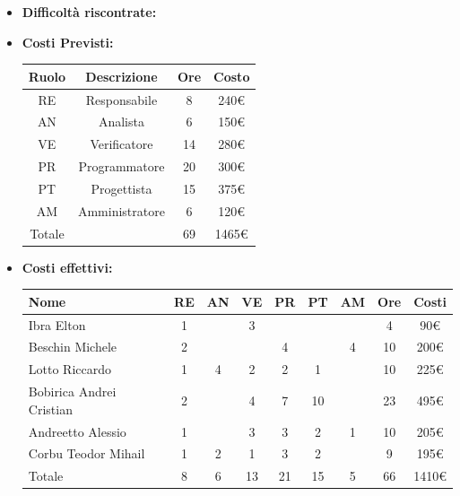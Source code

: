 \begin{itemize}
\begin{itemize}
            \end{itemize}
            \item \textbf{Difficoltà riscontrate:}
            \item \textbf{Costi Previsti:}
            \begin{longtable}{|c|c|c|c|}
                \hline
                Ruolo & Descrizione & Ore & Costo \\
                \hline
                RE & Responsabile & 8 &  240€\\
                \hline
                AN & Analista & 6 &  150€\\
                \hline
                VE & Verificatore & 14 &  280€\\
                \hline
                PR & Programmatore & 20 & 300€ \\
                \hline
                PT & Progettista & 15 & 375€ \\
                \hline
                AM & Amministratore & 6 &  120€\\
                \hline
                Totale & & 69 & 1465€ \\
                \hline
                \end{longtable}
            \item \textbf{Costi effettivi:}
            \begin{longtable}{|p{}|c|c|c|c|c|c|c|c|}
                \hline
                Nome & RE & AN & VE & PR & PT & AM & Ore & Costi\\
                \hline
                Ibra \newline Elton &1 & &3 & & & &4 &90€ \\
                \hline
                Beschin Michele & 2& & & 4& & 4& 10&200€ \\
                \hline
                Lotto \newline Riccardo & 1& 4& 2& 2& 1& & 10& 225€\\
                \hline
                Bobirica Andrei Cristian &2 & &4 &7 &10 & &23 &495€ \\
                \hline
                Andreetto Alessio & 1& & 3& 3& 2& 1& 10& 205€\\
                \hline
                Corbu Teodor Mihail & 1& 2& 1& 3& 2& & 9& 195€\\
                \hline
                Totale &8 &6 &13 &21 &15 &5 &66 &1410€ \\
                \hline
            \end{longtable}
            \end{itemize}


